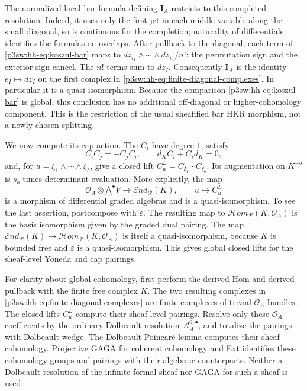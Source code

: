 \documentclass[11pt]{article}
\numberwithin{equation}{section}
\begin{document}
The normalized local bar formula defining \(\mathbf I_A\) restricts
to this completed resolution.  Indeed, it uses only the first jet in
each middle variable along the small diagonal, so is continuous for
the completion; naturality of differentials identifies the formulas
on overlaps.  After pullback to the diagonal, each term of
\eqref{p3sw:hh-eq:koszul-bar} maps to
\(dz_{i_1}\wedge\cdots\wedge dz_{i_n}/n!\): the permutation sign
and the exterior sign cancel.  The \(n!\) terms sum to \(dz_I\).
Consequently \(\mathbf I_A\) is the identity
\(e_I\mapsto dz_I\) on the first complex in
\eqref{p3sw:hh-eq:finite-diagonal-complexes}.  In particular it is a
quasi-isomorphism.  Because the comparison
\eqref{p3sw:hh-eq:koszul-bar} is global, this conclusion has no
additional off-diagonal or higher-cohomology component.  This is the
restriction of the usual sheafified bar HKR morphism, not a newly
chosen splitting.

We now compute its cap action.  The \(C_i\) have degree \(1\), satisfy
\[
 C_iC_j=-C_jC_i,\qquad d_KC_i+C_i d_K=0,
\]
and, for \(u=\xi_1\wedge\cdots\wedge\xi_b\), give a closed lift
\(C_u^L=C_{\xi_1}\cdots C_{\xi_b}\).
Its augmentation on \(K^{-b}\) is \(s_b\) times determinant
evaluation.  More explicitly, the map
\[
 \mathcal O_A\otimes\mathord{\bigwedge}^{\bullet}V
       \longrightarrow\mathcal{E}nd_{\mathcal R}(K),
 \qquad u\longmapsto C_u^L
\]
is a morphism of differential graded algebras and is a
quasi-isomorphism.  To see the last assertion, postcompose with
\(\varepsilon\).  The resulting map to
\(\mathcal{H}om_{\mathcal R}(K,\mathcal O_A)\) is the basis
isomorphism given by the graded dual pairing.  The map
\(\mathcal{E}nd_{\mathcal R}(K)\to
  \mathcal{H}om_{\mathcal R}(K,\mathcal O_A)\)
is itself a quasi-isomorphism, because \(K\) is bounded free and
\(\varepsilon\) is a quasi-isomorphism.  This gives global closed
lifts for the sheaf-level Yoneda and cap pairings.

For clarity about global cohomology, first perform the derived Hom
and derived pullback with the finite free complex \(K\).  The two
resulting complexes in
\eqref{p3sw:hh-eq:finite-diagonal-complexes} are finite complexes of
trivial \(\mathcal O_A\)-bundles.  The closed lifts \(C_u^L\) compute
their sheaf-level pairings.  Resolve only these
\(\mathcal O_A\)-coefficients by the ordinary Dolbeault resolution
\(\mathcal A_A^{0,\bullet}\), and totalize the pairings with Dolbeault
wedge.  The Dolbeault Poincar\'e lemma computes their sheaf
cohomology.  Projective GAGA for coherent cohomology and Ext identifies
these cohomology groups and pairings with their algebraic counterparts.
Neither a Dolbeault resolution of the infinite formal sheaf nor GAGA
for such a sheaf is used.
\end{document}
